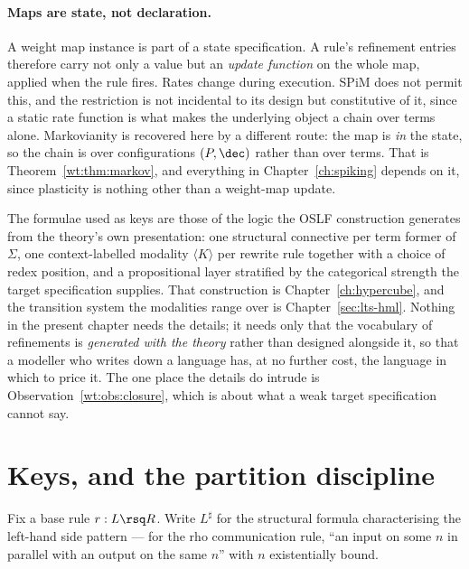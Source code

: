 \paragraph{Maps are state, not declaration.} A weight map instance is part of a state
specification. A rule's refinement entries therefore carry not only a value but an
\emph{update function} on the whole map, applied when the rule fires. Rates change during
execution. SPiM does not permit this, and the restriction is not incidental to its design
but constitutive of it, since a static rate function is what makes the underlying object
a chain over terms alone. Markovianity is recovered here by a different route: the map is
\emph{in} the state, so the chain is over configurations $(P, \dec)$ rather than over
terms. That is Theorem~\ref{wt:thm:markov}, and everything in
Chapter~\ref{ch:spiking} depends on it, since plasticity is nothing other than a
weight-map update.

\begin{remark}
\label{wt:rmk:whence}
The formulae used as keys are those of the logic the OSLF construction generates from the
theory's own presentation: one structural connective per term former of $\Sigma$, one
context-labelled modality $\langle K \rangle$ per rewrite rule together with a choice of
redex position, and a propositional layer stratified by the categorical strength the
target specification supplies. That construction is Chapter~\ref{ch:hypercube}, and the
transition system the modalities range over is Chapter~\ref{sec:lts-hml}. Nothing in the
present chapter needs the details; it needs only that the vocabulary of refinements is
\emph{generated with the theory} rather than designed alongside it, so that a modeller who
writes down a language has, at no further cost, the language in which to price it. The
one place the details do intrude is
Observation~\ref{wt:obs:closure}, which is about what a weak target specification cannot
say.
\end{remark}

\section{Keys, and the partition discipline}

Fix a base rule $r : L \rsq R$. Write $L^{\sharp}$ for the structural formula
characterising the left-hand side pattern --- for the rho communication rule, ``an input
on some $n$ in parallel with an output on the same $n$'' with $n$ existentially bound.

